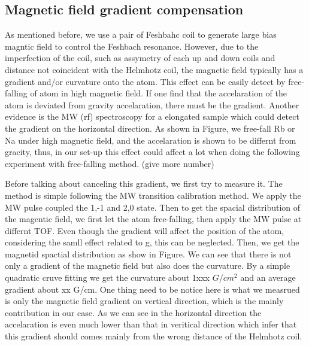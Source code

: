 \subsection{Magnetic field gradient compensation}
As mentioned before, we use a pair of Feshbahc coil to generate large bias magntic field to control the Feshbach resonance. However, due to the imperfection of the coil, such as assymetry of each up and down coils and distance not coincident with the Helmhotz coil, the magnetic field typically has a gradient and/or curvature onto the atom. This effect can be easily detect by free-falling of atom in high magnetic field. If one find that the accelaration of the atom is deviated from gravity accelaration, there must be the gradient. Another evidence is the MW (rf) spectroscopy for a elongated sample which could detect the gradient on the horizontal direction. As shown in Figure, we free-fall Rb or Na under high magnetic field, and the accelaration is shown to be differnt from gracity, thus, in our set-up this effect could affect a lot when doing the following experiment with free-falling method. (give more number) 

Before talking about canceling this gradient, we first try to measure it. The method is simple following the MW transition calibration method. We apply the MW pulse coupled the 1,-1 and 2,0 state. Then to get the spacial distribution of the magentic field, we first let the atom free-falling, then apply the MW pulse at differnt TOF. Even though the gradient will affect the position of the atom, considering the samll effect related to g, this can be neglected. Then, we get the magnetid spactial distribution as show in Figure. We can see that there is not only a gradient of the magnetic field but also does the curvature. By a simple quadratic cruve fitting we get the curvature about 1xxx \(G/cm^2\) and an average gradient about xx G/cm. One thing need to be notice here is what we measrued is only the magnetic field gradient on vertical direction, which is the mainly contribution in our case. As we can see in the horizontal direction the accelaration is even much lower than that in veritical direction which infer that this gradient should comes mainly from the wrong distance of the Helmhotz coil.

